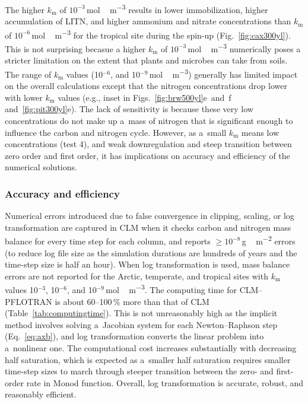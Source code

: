 \documentclass[gmd,noline]{copernicus}
\begin{document}
      The higher $k_\mathrm{m}$ of
      $10^{-3}$\,\unit{mol\,m^{-3}} results in lower immobilization, higher
      accumulation of LITN, and higher ammonium and nitrate concentrations
      than $k_\mathrm{m}$ of $10^{-6}$\,\unit{mol\,m^{-3}} for the tropical site
      during the spin-up (Fig.~\ref{fig:cax300yl}). This is not surprising becasue
      a higher $k_\mathrm{m}$ of $10^{-3}$\,\unit{mol\,m^{-3}} numerically poses
      a stricter limitation on the extent that plants and microbes can take from soils.
      The range of
      $k_\mathrm{m}$ values (10$^{-6}$, and 10$^{-9}$\,\unit{mol\,m^{-3}})
      generally has limited impact on the overall calculations except that
      the nitrogen concentrations drop lower with lower $k_\mathrm{m}$
      values (e.g., inset in Figs.~\ref{fig:brw500yl}e~and~f
      and~\ref{fig:pit300yl}e). The lack of sensitivity is because these
      very low concentrations do not make up a~mass of nitrogen that is
      significant enough to influence the carbon and nitrogen cycle.
      However, as a~small $k_\mathrm{m}$ means low concentrations (test 4),
      and weak downregulation and steep transition between zero order and
      first order, it has implications on accuracy and efficiency of the
      numerical solutions.



\subsubsection{Accuracy and efficiency}%

      Numerical errors introduced due to false convergence in clipping,
      scaling, or log transformation are captured in CLM when it checks
      carbon and nitrogen mass balance for every time step for each column,
      and reports $\geq 10^{-8}$\,\unit{g\,m^{-2}} errors (to reduce log file size as the simulation durations are hundreds of years and the time-step size is half an hour).  When log
      transformation is used, mass balance errors are not reported for the
      Arctic, temperate, and tropical sites with $k_\mathrm{m}$ values
      10$^{-3}$, 10$^{-6}$, and 10$^{-9}$\,\unit{mol\,m^{-3}}. The computing
      time for CLM--PFLOTRAN is about 60--100\,{\%} more than that of
      CLM (Table~\ref{tab:computingtime}). This is not unreasonably high as
      the implicit method involves solving a~Jacobian system for each
      Newton--Raphson step (Eq.~\ref{eq:axb}), and log transformation
      converts the linear problem into a~nonlinear one. The computational
      cost increases substantially with decreasing half saturation, which is
      expected as a~smaller half saturation requires smaller time-step sizes
      to march through steeper transition between the zero- and first-order
      rate in Monod function. Overall, log transformation is accurate,
      robust, and reasonably efficient.
\end{document}
